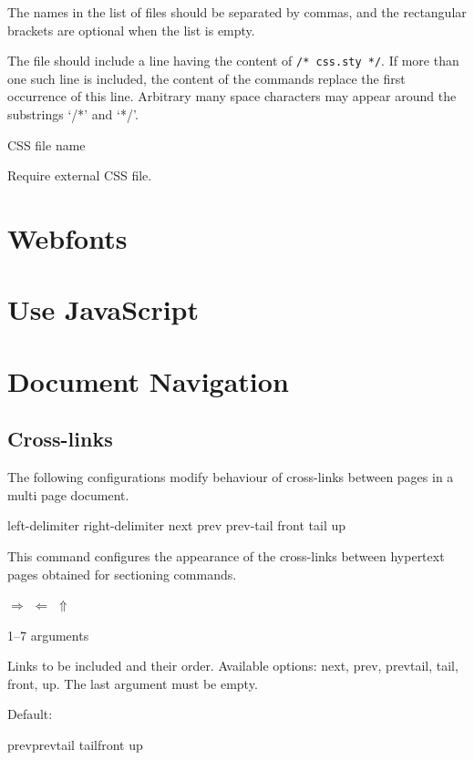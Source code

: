 \documentclass{book}
\begin{document}
The names in the list of files should be separated by commas, and the rectangular brackets are optional when the list is empty.

The file should include a line having the content of \verb|/* css.sty */|. If
more than one such line is included, the content of the  commands
replace the first occurrence of this line. Arbitrary many space characters may
appear around the substrings ‘/*’ and ‘*/’. 

 {CSS file name}\EndDoc

Require external CSS file.

\section{Webfonts}

\section{Use JavaScript}
\section{Document Navigation}

\subsection{Cross-links}

The following configurations modify behaviour of cross-links between pages in a multi page document.

 {left-delimiter} {right-delimiter} {next} {prev} {prev-tail} {front} {tail} {up}\EndDoc

This command configures the appearance of the cross-links between hypertext pages obtained for sectioning commands.

\begin{texsource}
   {}{}{$\scriptstyle\Rightarrow$}
   {$\scriptstyle\Leftarrow$}
   {}{}{}{$\scriptstyle\Uparrow$}
\end{texsource}

 {1--7 arguments}\EndDoc

  Links to be included and their order. Available
  options: next, prev, prevtail, tail, front, up.
  The last argument must be empty.

  Default:

\begin{texsource}
   {prev}{prevtail}
   {tail}{front}
   {up}{}
\end{texsource}
\end{document}
